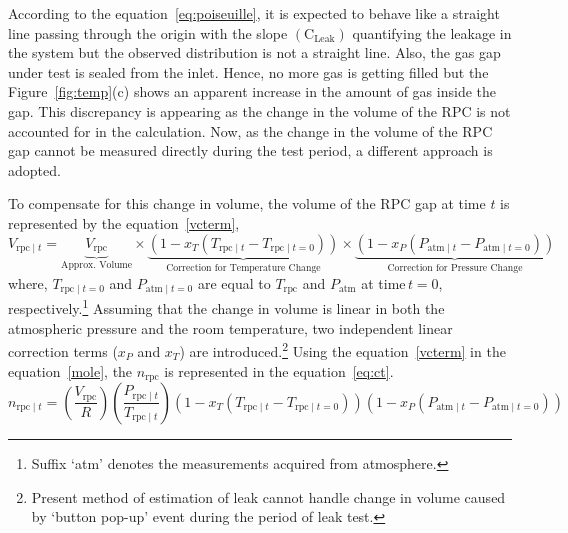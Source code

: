 According to the equation~\ref{eq:poiseuille}, it is expected to behave like a
straight line passing through the origin with the slope
$\left(\textrm{C}_{\textrm{Leak}}\right)$ quantifying the leakage in the system
but the observed distribution is not a straight line. Also, the gas gap under
test is sealed from the inlet. Hence, no more gas is getting filled but the
Figure~\ref{fig:temp}(c) shows an apparent increase in the amount of gas inside
the gap. This discrepancy is appearing as the change in the volume of the RPC
is not accounted for in the calculation. Now, as the change in the volume of the
RPC gap cannot be measured directly during the test period, a different
approach is adopted.

To compensate for this change in volume, the volume of the RPC gap at time $t$
is represented by the equation~\ref{vcterm},
\begin{equation}
  V_{\textrm{rpc}\mid t} = \underbrace{V_{\textrm{rpc}}}_{\text{Approx. Volume}}\times\underbrace{\left(1-x_T\left(T_{\textrm{rpc}\mid t}-T_{\textrm{rpc}\mid t=0}\right)\right)}_{\text{Correction for Temperature Change}}\times\underbrace{\left(1-x_P\left(P_{\textrm{atm}\mid t}-P_{\textrm{atm}\mid t=0}\right)\right)}_{\text{Correction for Pressure Change}}\label{vcterm}
\end{equation}
where, $T_{\textrm{rpc}\mid t=0}$ and $P_{\textrm{atm}\mid t=0}$ are equal to
$T_{\textrm{rpc}}$ and $P_{\textrm{atm}}$ at time\,$t=0$, respectively.\footnote{Suffix `atm' denotes the measurements acquired from atmosphere.}
Assuming that the change in volume is linear in both the atmospheric pressure
and the room temperature, two independent linear correction terms ($x_P$ and
$x_T$) are introduced.\footnote{Present method of estimation of leak cannot handle change in volume caused by `button pop-up' event during the period of leak test.}
Using the equation~\ref{vcterm} in the equation~\ref{mole}, the $n_{\textrm{rpc}}$
is represented in the equation~\ref{eq:ct}.
\begin{equation}
  n_{\textrm{rpc}\mid t}=\left(\frac{V_{\textrm{rpc}}}{R}\right)\left(\frac{P_{\textrm{rpc}\mid t}}{T_{\textrm{rpc}\mid t}}\right)\left(1-x_T\left(T_{\textrm{rpc}\mid t}-T_{\textrm{rpc}\mid t=0}\right)\right)\left(1-x_P\left(P_{\textrm{atm}\mid t}-P_{\textrm{atm}\mid t=0}\right)\right) \label{eq:ct}
\end{equation}

